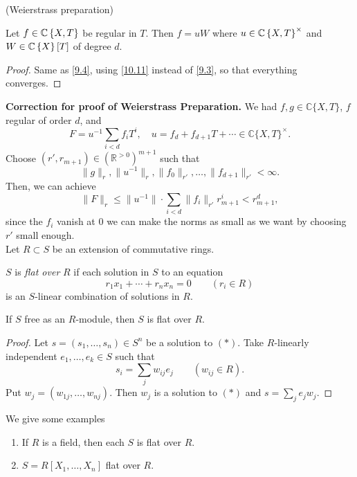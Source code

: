 \begin{cor*}
\label{10.12} (Weierstrass preparation)

Let $f\in\mathbb{C}\left\{ X,T\right\} $ be regular in $T$. Then $f=uW$
where $u\in\mathbb{C}\left\{ X,T\right\} ^{\times}$ and $W\in\mathbb{C}\left\{ X\right\} \left[T\right]$
of degree $d$.\end{cor*}
\begin{proof}
Same as \ref{9.4}, using \ref{10.11} instead of \ref{9.3}, so that everything
converges.\end{proof}


\textbf{Correction for proof of Weierstrass Preparation.} We had $f, g\in \mathds{C}\{X, T\}$, $f$ regular of order $d$, and
$$F=u^{-1}\sum_{i<d}f_iT^i, \quad u=f_d + f_{d+1}T+ \cdots \in \mathds{C}\{X, T\}^\times.$$
Choose $(r', r_{m+1})\in (\mathds{R}^{>0})^{m+1}$ such that
$$\|g\|_r, \|u^{-1}\|_r, \|f_0\|_{r'}, \dots, \|f_{d+1}\|_{r'}<\infty.$$
Then, we can achieve
$$\|F\|_r\leq \|u^{-1}\|\cdot \sum_{i<d}\|f_i\|_{r'}r^i_{m+1}<r^d_{m+1},$$
since the $f_i$ vanish at $0$ we can make the norms as small as we want by choosing $r'$ small enough.\\

Let $R\subset S$ be an extension of commutative rings.

\begin{definition} $S$ is \textit{flat over} $R$ if each solution in $S$ to an equation
\begin{equation} r_1x_1+\cdots + r_n x_n=0 \qquad (r_i\in R) \tag{$*$}\end{equation}
is an $S$-linear combination of solutions in $R$. \end{definition}

\begin{lemma} If $S$ free as an $R$-module, then $S$ is flat over $R$. \end{lemma}

\begin{proof} Let $s=(s_1, \dots, s_n)\in S^n$ be a solution to $(*)$.  Take $R$-linearly independent $e_1, \dots, e_k\in S$ such that
$$s_i=\sum_j w_{ij} e_j \qquad (w_{ij}\in R).$$
Put $w_j=(w_{1j}, \dots, w_{nj})$.  Then $w_j$ is a solution to $(*)$ and $s=\sum_j e_jw_j.$
\end{proof}

We give some examples
\begin{enumerate}%
\item If $R$ is a field, then each $S$ is flat over $R$.  
\item $S=R[X_1, \dots, X_n]$ flat over $R$.
\end{enumerate}

